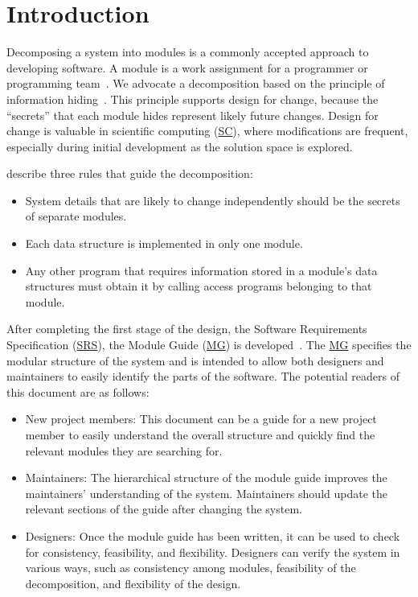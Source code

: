 \documentclass[12pt, titlepage]{article}
\DeclareRobustCommand{\mgabbr}[2]{\hyperlink{mg-abbr:#1}{#2}}
\begin{document}
\newpage

\tableofcontents

\listoftables

\listoffigures

\newpage


\section{Introduction}

Decomposing a system into modules is a commonly accepted approach to developing
software.  A module is a work assignment for a programmer or programming
team~\citep{ParnasEtAl1984}.  We advocate a decomposition
based on the principle of information hiding~\citep{Parnas1972a}.  This
principle supports design for change, because the ``secrets'' that each module
hides represent likely future changes.  Design for change is valuable in
scientific computing (\mgabbr{sc}{SC}),
where modifications are frequent, especially during initial development as the
solution space is explored.

\citet{ParnasEtAl1984} describe three rules that guide the decomposition:
\begin{itemize}
\item System details that are likely to change independently should be the
  secrets of separate modules.
\item Each data structure is implemented in only one module.
\item Any other program that requires information stored in a module's data
  structures must obtain it by calling access programs belonging to that module.
\end{itemize}

After completing the first stage of the design, the Software Requirements
Specification (\mgabbr{srs}{SRS}), the Module Guide (\mgabbr{mg}{MG}) is
developed~\citep{ParnasEtAl1984}. The \mgabbr{mg}{MG}
specifies the modular structure of the system and is intended to allow both
designers and maintainers to easily identify the parts of the software.  The
potential readers of this document are as follows:

\begin{itemize}
\item New project members: This document can be a guide for a new project member
  to easily understand the overall structure and quickly find the
  relevant modules they are searching for.
\item Maintainers: The hierarchical structure of the module guide improves the
  maintainers' understanding of the system. Maintainers should update the
  relevant sections of the guide after changing the system.
\item Designers: Once the module guide has been written, it can be used to
  check for consistency, feasibility, and flexibility. Designers can verify the
  system in various ways, such as consistency among modules, feasibility of the
  decomposition, and flexibility of the design.
\end{itemize}
\end{document}
